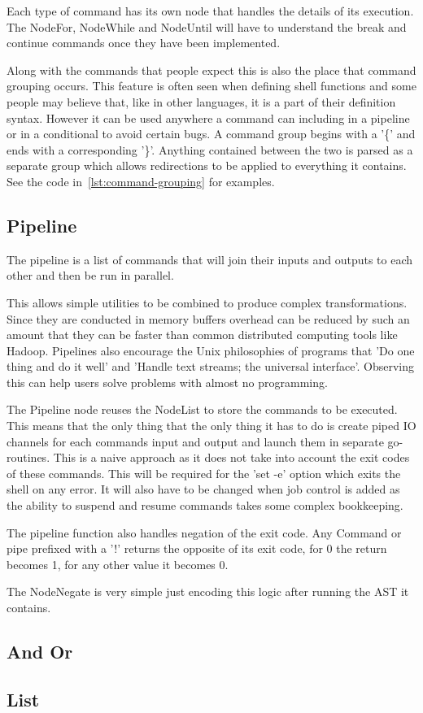 Each type of command has its own node that handles the details of its execution.
The NodeFor, NodeWhile and NodeUntil will have to understand the break and continue commands once they have been implemented.

Along with the commands that people expect this is also the place that command grouping occurs.
This feature is often seen when defining shell functions and some people may believe that, like in other languages, it is a part of their definition syntax.
However it can be used anywhere a command can including in a pipeline or in a conditional to avoid certain bugs.
A command group begins with a '\{' and ends with a corresponding '\}'.
Anything contained between the two is parsed as a separate group which allows redirections to be applied to everything it contains.
See the code in~\ref{lst:command-grouping} for examples.

\subsection{Pipeline}
The pipeline is a list of commands that will join their inputs and outputs to each other and then be run in parallel.

This allows simple utilities to be combined to produce complex transformations.
Since they are conducted in memory buffers overhead can be reduced by such an amount that they can be faster than common distributed computing tools like Hadoop\cite{AdamD45:online}.
Pipelines also encourage the Unix philosophies of programs that 'Do one thing and do it well' and 'Handle text streams; the universal interface'.
Observing this can help users solve problems with almost no programming\cite{LITERATE-VS-SHELL}.

The Pipeline node reuses the NodeList to store the commands to be executed.
This means that the only thing that the only thing it has to do is create piped IO channels for each commands input and output and launch them in separate go-routines.
This is a naive approach as it does not take into account the exit codes of these commands.
This will be required for the 'set -e' option which exits the shell on any error.
It will also have to be changed when job control is added as the ability to suspend and resume commands takes some complex bookkeeping.

The pipeline function also handles negation of the exit code.
Any Command or pipe prefixed with a '!' returns the opposite of its exit code, for 0 the return becomes 1, for any other value it becomes 0.

The NodeNegate is very simple just encoding this logic after running the AST it contains.

\subsection{And Or}


\subsection{List}













